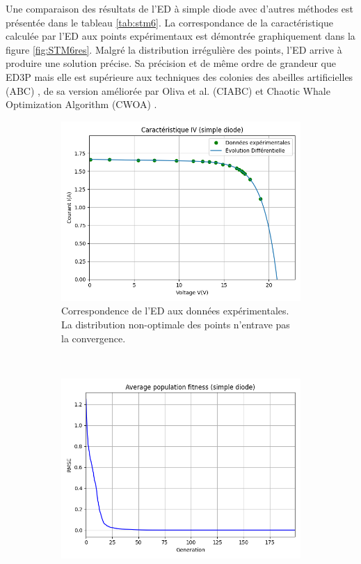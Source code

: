 Une comparaison des résultats de l'ED à simple diode avec d'autres méthodes est présentée dans le tableau \ref{tab:stm6}. La correspondance de la caractéristique calculée par l'ED aux points expérimentaux est démontrée graphiquement dans la figure \ref{fig:STM6res}. Malgré la distribution irrégulière des points, l'ED arrive à produire une solution précise. Sa précision et de même ordre de grandeur que ED3P \cite{Chin2019} mais elle est supérieure aux techniques des colonies des abeilles artificielles (ABC) \cite{Oliva2014}, de sa version améliorée par Oliva et al. (CIABC) \cite{Oliva2017a} et Chaotic Whale Optimization Algorithm (CWOA) \cite{Oliva2017}.
\begin{figure}
    \centering
    \begin{subfigure}[b]{0.45\textwidth}
        \includegraphics[width=\textwidth]{resources/STM6/singled/iv.png}
        \caption{Correspondence de l'ED aux données expérimentales. La distribution non-optimale des points n'entrave pas la convergence.}
    \end{subfigure}
    ~
    \begin{subfigure}[b]{0.45\textwidth}
        \includegraphics[width=\textwidth]{resources/STM6/singled/fitness.png}

\end{subfigure}
\end{figure}
